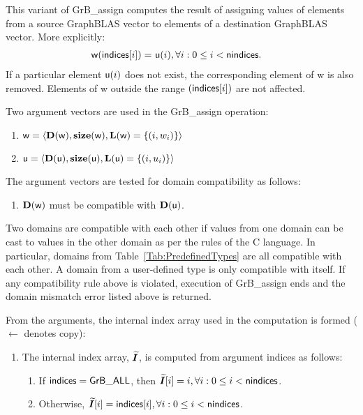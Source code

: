 This variant of {\sf GrB\_assign} computes the result of assigning values of elements from 
a source GraphBLAS vector to elements of a destination GraphBLAS vector. 
More explicitly:
\[
\begin{aligned}
	{\sf w}({\sf indices}[i]) = &\ {\sf u}(i),
    \forall i : 0 \leq i < {\sf nindices}.
\end{aligned}
\]  
If a particular element ${\sf u}(i)$ does not exist, the corresponding
element of {\sf w} is also removed. 
Elements of {\sf w} outside the range $({\sf indices}[i])$ are not affected.

Two argument vectors are used in the {\sf GrB\_assign} operation:
\begin{enumerate}
	\item ${\sf w} = \langle \bold{D}({\sf w}),\bold{size}({\sf w}),
    \bold{L}({\sf w}) = \{(i,w_i) \} \rangle$
    
	\item ${\sf u} = \langle \bold{D}({\sf u}),\bold{size}({\sf u}),
    \bold{L}({\sf u}) = \{(i,u_i) \} \rangle$
\end{enumerate}

The argument vectors 
are tested for domain compatibility as follows:
\begin{enumerate}
	\item $\bold{D}({\sf w})$ must be compatible with $\bold{D}({\sf u})$.
\end{enumerate}
Two domains are compatible with each other if values from one domain can be cast 
to values in the other domain as per the rules of the C language.
In particular, domains from Table~\ref{Tab:PredefinedTypes} are all compatible 
with each other. A domain from a user-defined type is only compatible with itself.
If any compatibility rule above is violated, execution of {\sf GrB\_assign} ends
and the domain mismatch error listed above is returned.

From the arguments, the internal index array used in 
the computation is formed ($\leftarrow$ denotes copy):
\begin{enumerate}
    \item The internal index array, $\bm{\widetilde{I}}$, is computed from 
    argument {\sf indices} as follows:
	\begin{enumerate}
		\item	If ${\sf indices} = {\sf GrB\_ALL}$, then 
        $\bm{\widetilde{I}}[i] = i, \forall i : 0 \leq i < {\sf nindices}$.

		\item	Otherwise, $\bm{\widetilde{I}}[i] = {\sf indices}[i], 
        \forall i : 0 \leq i < {\sf nindices}$.
    \end{enumerate}
\end{enumerate}

